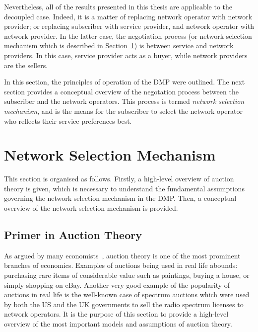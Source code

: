  Nevertheless, all of the results presented in this thesis are applicable to the decoupled case. Indeed, it is a matter of replacing network operator with network provider; or replacing subscriber with service provider, and network operator with network provider. In the latter case, the negotiation process (or network selection mechanism which is described in Section~\ref{sec:network_selection_mechanism_dmp}) is between service and network providers. In this case, service provider acts as a buyer, while network providers are the sellers.

In this section, the principles of operation of the DMP were outlined. The next section provides a conceptual overview of the negotation process between the subscriber and the network operators. This process is termed \emph{network selection mechanism}, and is the means for the subscriber to select the network operator who reflects their service preferences best.

\section{Network Selection Mechanism} %
\label{sec:network_selection_mechanism_dmp}
This section is organised as follows. Firstly, a high-level overview of auction theory is given, which is necessary to understand the fundamental assumptions governing the network selection mechanism in the DMP. Then, a conceptual overview of the network selection mechanism is provided.

\subsection{Primer in Auction Theory} %
\label{sub:primer_in_auction_theory_dmp}
As argued by many economists~\cite{Klemperer1999,Milgrom2004}, auction theory is one of the most prominent branches of economics. Examples of auctions being used in real life abounds: purchasing rare items of considerable value such as paintings, buying a house, or simply shopping on eBay. Another very good example of the popularity of auctions in real life is the well-known case of spectrum auctions which were used by both the US and the UK governments to sell the radio spectrum licenses to network operators. It is the purpose of this section to provide a high-level overview of the most important models and assumptions of auction theory.

